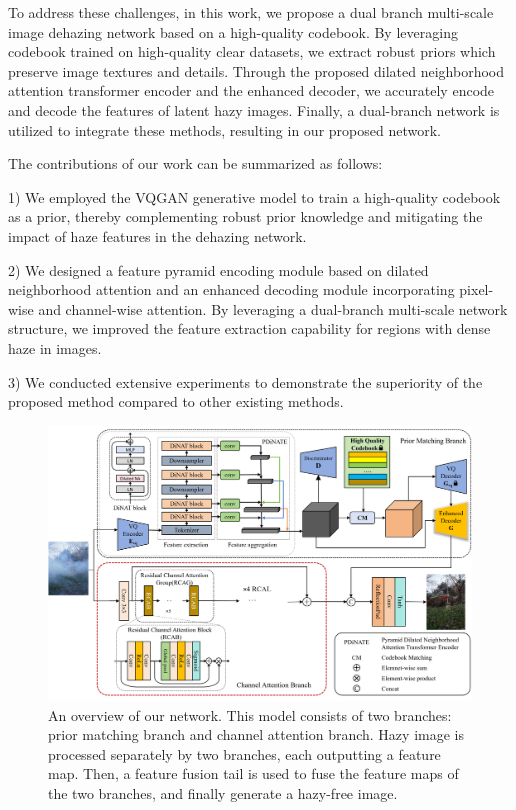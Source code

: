 \documentclass[lettersize,journal]{IEEEtran}
\begin{document}
To address these challenges, in this work, we propose a dual branch multi-scale image dehazing network based on a high-quality codebook. By leveraging codebook trained on high-quality clear datasets, we extract robust priors which preserve image textures and details. Through the proposed dilated neighborhood attention transformer encoder and the enhanced decoder, we accurately encode and decode the features of latent hazy images. Finally, a dual-branch network is utilized to integrate these methods, resulting in our proposed network.

The contributions of our work can be summarized as follows:

\begin{list}{}{}
\item{1) We employed the VQGAN generative model to train a high-quality codebook as a prior, thereby complementing robust prior knowledge and mitigating the impact of haze features in the dehazing network.}

\item{2) We designed a feature pyramid encoding module based on dilated neighborhood attention and an enhanced decoding module incorporating pixel-wise and channel-wise attention. By leveraging a dual-branch multi-scale network structure, we improved the feature extraction capability for regions with dense haze in images.}

\item{3) We conducted extensive experiments to demonstrate the superiority of the proposed method compared to other existing methods.}
\end{list}
 
\begin{figure}[!t]
	\centering
	\includegraphics[width=7in]{network_architecture}
	\caption{An overview of our network. This model consists of two branches: prior matching branch and channel attention branch. Hazy image is processed separately by two branches, each outputting a feature map. Then, a feature fusion tail is used to fuse the feature maps of the two branches, and finally generate a hazy-free image.}
	\label{fig0}
\end{figure}
\end{document}
